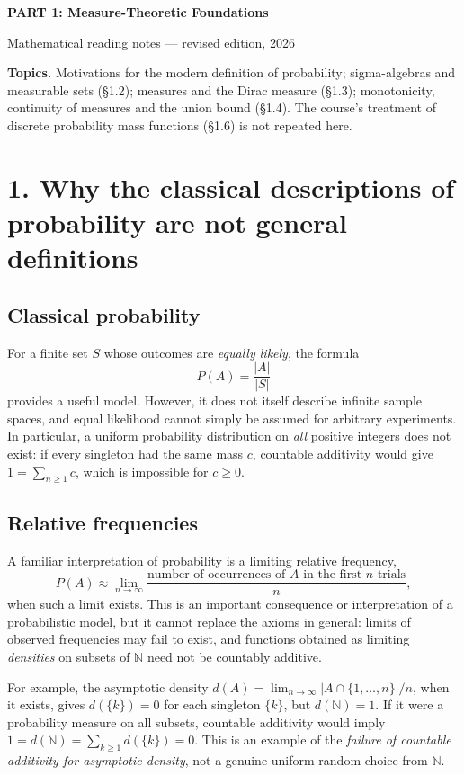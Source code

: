 \documentclass[10pt,a4paper]{article}
\newcommand{\N}{\mathbb N}\newcommand{\Q}{\mathbb Q}\newcommand{\R}{\mathbb R}
\begin{document}
\begin{center}
{\Large\bfseries PART 1: Measure-Theoretic Foundations}\par
{\normalsize Mathematical reading notes --- revised edition, 2026}
\end{center}
\vspace{8pt}
\textbf{Topics.} Motivations for the modern definition of probability; sigma-algebras and measurable sets (\S1.2); measures and the Dirac measure (\S1.3); monotonicity, continuity of measures and the union bound (\S1.4). The course's treatment of discrete probability mass functions (\S1.6) is not repeated here.

\section*{1. Why the classical descriptions of probability are not general definitions}
\subsection*{Classical probability}
For a finite set $S$ whose outcomes are \emph{equally likely}, the formula
\[
P(A)=\frac{|A|}{|S|}
\]
provides a useful model. However, it does not itself describe infinite sample spaces, and equal likelihood cannot simply be assumed for arbitrary experiments. In particular, a uniform probability distribution on \emph{all} positive integers does not exist: if every singleton had the same mass $c$, countable additivity would give $1=\sum_{n\ge1}c$, which is impossible for $c\ge0$.

\subsection*{Relative frequencies}
A familiar interpretation of probability is a limiting relative frequency,
\[
P(A)\approx \lim_{n\to\infty}\frac{\text{number of occurrences of }A\text{ in the first }n\text{ trials}}{n},
\]
when such a limit exists. This is an important consequence or interpretation of a probabilistic model, but it cannot replace the axioms in general: limits of observed frequencies may fail to exist, and functions obtained as limiting \emph{densities} on subsets of $\N$ need not be countably additive.

For example, the asymptotic density $d(A)=\lim_{n\to\infty}|A\cap\{1,\ldots,n\}|/n$, when it exists, gives $d(\{k\})=0$ for each singleton $\{k\}$, but $d(\N)=1$. If it were a probability measure on all subsets, countable additivity would imply $1=d(\N)=\sum_{k\ge1}d(\{k\})=0$. This is an example of the \emph{failure of countable additivity for asymptotic density}, not a genuine uniform random choice from $\N$.
\end{document}
